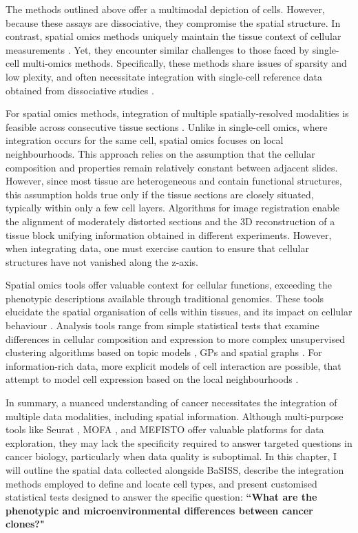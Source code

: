 The methods outlined above offer a multimodal depiction of cells. However, because these assays are dissociative, they compromise the spatial structure. In contrast, spatial omics methods uniquely maintain the tissue context of cellular measurements . Yet, they encounter similar challenges to those faced by single-cell multi-omics methods. Specifically, these methods share issues of sparsity and low plexity, and often necessitate integration with single-cell reference data obtained from dissociative studies . 

For spatial omics methods, integration of multiple spatially-resolved modalities is feasible across consecutive tissue sections . Unlike in single-cell omics, where integration occurs for the same cell, spatial omics focuses on local neighbourhoods. This approach relies on the assumption that the cellular composition and properties remain relatively constant between adjacent slides. However, since most tissue are heterogeneous and contain functional structures, this assumption holds true only if the tissue sections are closely situated, typically within only a few cell layers. Algorithms for image registration enable the alignment of moderately distorted sections and the 3D reconstruction of a tissue block \parencite{Kiemen2020-dc} unifying information obtained in different experiments. However, when integrating data, one must exercise caution to ensure that cellular structures have not vanished along the z-axis.

Spatial omics tools offer valuable context for cellular functions, exceeding the phenotypic descriptions available through traditional genomics. These tools elucidate the spatial organisation of cells within tissues, and its impact on cellular behaviour . Analysis tools range from simple statistical tests that examine differences in cellular composition and expression to more complex unsupervised clustering algorithms based on topic models \parencite{Nirmal2022-sq}, \aclp{GP} \parencite{Svensson2018-eu} and spatial graphs \parencite{Danenberg2022-zb}. For information-rich data, more explicit models of cell interaction are possible, that attempt to model cell expression based on the local neighbourhoods \parencite{Fischer2023-go}.

In summary, a nuanced understanding of cancer necessitates the integration of multiple data modalities, including spatial information. Although multi-purpose tools like Seurat \parencite{Hao2021-qn}, MOFA \parencite{Argelaguet2018-oz}, and MEFISTO \parencite{Velten2022-gc} offer valuable platforms for data exploration, they may lack the specificity required to answer targeted questions in cancer biology, particularly when data quality is suboptimal. In this chapter, I will outline the spatial data collected alongside \ac{BaSISS}, describe the integration methods employed to define and locate cell types, and present customised statistical tests designed to answer the specific question: \textbf{``What are the phenotypic and microenvironmental differences between cancer clones?"}


